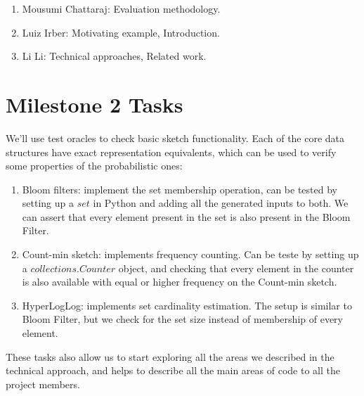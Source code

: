 \documentclass[preprint,nocopyrightspace]{sig-alternate}
\begin{document}
\begin{enumerate}
\item[] Mousumi Chattaraj: Evaluation methodology.
\item[] Luiz Irber: Motivating example, Introduction.
\item[] Li Li: Technical approaches, Related work.
\end{enumerate}

\section{Milestone 2 Tasks}

We'll use test oracles to check basic sketch functionality.
Each of the core data structures have exact representation equivalents,
which can be used to verify some properties of the probabilistic ones:
\begin{enumerate}
\item Bloom filters: implement the set membership operation,
can be tested by setting up a $set$ in Python and adding all the generated inputs to both.
We can assert that every element present in the set is also present in the Bloom Filter.
\item Count-min sketch: implements frequency counting.
Can be teste by setting up a $collections.Counter$ object,
and checking that every element in the counter is also available with equal or higher frequency on the Count-min sketch.
\item HyperLogLog: implements set cardinality estimation.
The setup is similar to Bloom Filter,
but we check for the set size instead of membership of every element.
\end{enumerate}

These tasks also allow us to start exploring all the areas we described in the technical approach,
and helps to describe all the main areas of code to all the project members.


\end{document}
